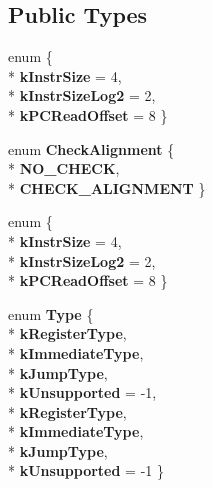\subsection*{Public Types}
\begin{DoxyCompactItemize}
\item 
enum \{ \\*
{\bfseries k\+Instr\+Size} = 4, 
\\*
{\bfseries k\+Instr\+Size\+Log2} = 2, 
\\*
{\bfseries k\+P\+C\+Read\+Offset} = 8
 \}\hypertarget{classv8_1_1internal_1_1_instruction_af20ce3bf7a1b65b4eb39cb40b53a8d95}{}\label{classv8_1_1internal_1_1_instruction_af20ce3bf7a1b65b4eb39cb40b53a8d95}

\item 
enum {\bfseries Check\+Alignment} \{ \\*
{\bfseries N\+O\+\_\+\+C\+H\+E\+CK}, 
\\*
{\bfseries C\+H\+E\+C\+K\+\_\+\+A\+L\+I\+G\+N\+M\+E\+NT}
 \}\hypertarget{classv8_1_1internal_1_1_instruction_ac2dd89da7f115bc053a0a65209db0184}{}\label{classv8_1_1internal_1_1_instruction_ac2dd89da7f115bc053a0a65209db0184}

\item 
enum \{ \\*
{\bfseries k\+Instr\+Size} = 4, 
\\*
{\bfseries k\+Instr\+Size\+Log2} = 2, 
\\*
{\bfseries k\+P\+C\+Read\+Offset} = 8
 \}\hypertarget{classv8_1_1internal_1_1_instruction_af101e2fe463e3363a06913d5c151ae1a}{}\label{classv8_1_1internal_1_1_instruction_af101e2fe463e3363a06913d5c151ae1a}

\item 
enum {\bfseries Type} \{ \\*
{\bfseries k\+Register\+Type}, 
\\*
{\bfseries k\+Immediate\+Type}, 
\\*
{\bfseries k\+Jump\+Type}, 
\\*
{\bfseries k\+Unsupported} = -\/1, 
\\*
{\bfseries k\+Register\+Type}, 
\\*
{\bfseries k\+Immediate\+Type}, 
\\*
{\bfseries k\+Jump\+Type}, 
\\*
{\bfseries k\+Unsupported} = -\/1
 \}\hypertarget{classv8_1_1internal_1_1_instruction_a4599db43cd142c37237809a72f46d840}{}\label{classv8_1_1internal_1_1_instruction_a4599db43cd142c37237809a72f46d840}


\end{DoxyCompactItemize}
